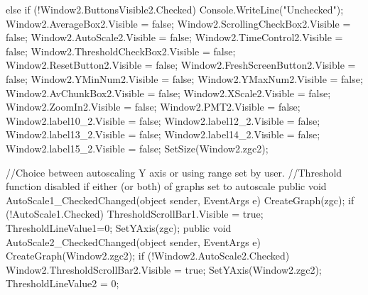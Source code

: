 {{{            else if (!Window2.ButtonsVisible2.Checked)
            {
                Console.WriteLine("Unchecked");
                Window2.AverageBox2.Visible = false;
                Window2.ScrollingCheckBox2.Visible = false;
                Window2.AutoScale2.Visible = false;
                Window2.TimeControl2.Visible = false;
                Window2.ThresholdCheckBox2.Visible = false;
                Window2.ResetButton2.Visible = false;
                Window2.FreshScreenButton2.Visible = false;
                Window2.YMinNum2.Visible = false;
                Window2.YMaxNum2.Visible = false;
                Window2.AvChunkBox2.Visible = false;
                Window2.XScale2.Visible = false;
                Window2.ZoomIn2.Visible = false;
                Window2.PMT2.Visible = false;
                Window2.label10_2.Visible = false;
                Window2.label12_2.Visible = false;
                Window2.label13_2.Visible = false;
                Window2.label14_2.Visible = false;
                Window2.label15_2.Visible = false;
            }
            SetSize(Window2.zgc2);
        }

        //Choice between autoscaling Y axis or using range set by user.
        //Threshold function disabled if either (or both) of graphs set to autoscale
        public void AutoScale1_CheckedChanged(object sender, EventArgs e)
        {
            CreateGraph(zgc);
            if (!AutoScale1.Checked)
            {
                ThresholdScrollBar1.Visible = true;
                ThresholdLineValue1=0;
                SetYAxis(zgc);
            }          
        }
        public void AutoScale2_CheckedChanged(object sender, EventArgs e)
        {
            CreateGraph(Window2.zgc2);
            if (!Window2.AutoScale2.Checked)
            {
               Window2.ThresholdScrollBar2.Visible = true;
               SetYAxis(Window2.zgc2);
               ThresholdLineValue2 = 0;
            }
        }


    }
}